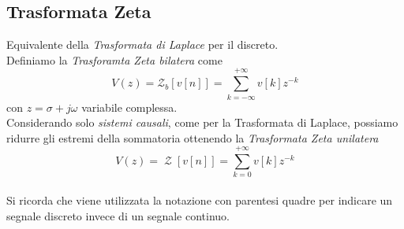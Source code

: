 \documentclass{article}
\newcommand{\Ztransf}{\mathop{\mathcal{Z}}}
\begin{document}
		\subsection{Trasformata Zeta}
			Equivalente della \textit{Trasformata di Laplace} per il discreto. \\
			Definiamo la \textit{Trasforamta Zeta bilatera} come
			\[
				V(z) = \mathcal{Z}_b[v[n]] = \sum_{k = -\infty}^{+\infty} {v[k]z^{-k}}
			\]
			con $ z = \sigma + j\omega $ variabile complessa. \\
			Considerando solo \textit{sistemi causali}, come per la Trasformata di Laplace, possiamo ridurre gli estremi della sommatoria ottenendo la \textit{Trasformata Zeta unilatera}
			\[
				V(z) = \Ztransf[v[n]] = \sum_{k = 0}^{+\infty} {v[k]z^{-k}}
			\] \\
			Si ricorda che viene utilizzata la notazione con parentesi quadre per indicare un segnale discreto invece di un segnale continuo.
\end{document}
